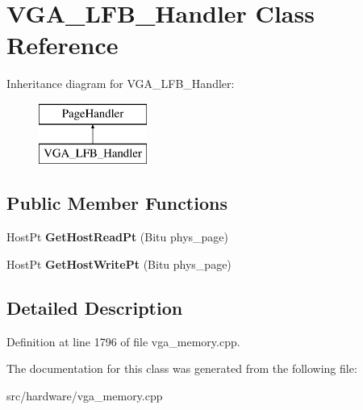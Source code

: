 \hypertarget{classVGA__LFB__Handler}{\section{V\-G\-A\-\_\-\-L\-F\-B\-\_\-\-Handler Class Reference}
\label{classVGA__LFB__Handler}
}
Inheritance diagram for V\-G\-A\-\_\-\-L\-F\-B\-\_\-\-Handler\-:\begin{figure}[H]
\begin{center}
\leavevmode
\includegraphics[height=2.000000cm]{classVGA__LFB__Handler}
\end{center}
\end{figure}
\subsection*{Public Member Functions}
\begin{DoxyCompactItemize}
\item 
\hypertarget{classVGA__LFB__Handler_ad4cf94e4a3b186e307f54fc0ca5f8a33}{Host\-Pt {\bfseries Get\-Host\-Read\-Pt} (Bitu phys\-\_\-page)}\label{classVGA__LFB__Handler_ad4cf94e4a3b186e307f54fc0ca5f8a33}

\item 
\hypertarget{classVGA__LFB__Handler_abc42ff47ee5307b3de27bed8594a1354}{Host\-Pt {\bfseries Get\-Host\-Write\-Pt} (Bitu phys\-\_\-page)}\label{classVGA__LFB__Handler_abc42ff47ee5307b3de27bed8594a1354}

\end{DoxyCompactItemize}


\subsection{Detailed Description}


Definition at line 1796 of file vga\-\_\-memory.\-cpp.



The documentation for this class was generated from the following file\-:\begin{DoxyCompactItemize}
\item 
src/hardware/vga\-\_\-memory.\-cpp\end{DoxyCompactItemize}
